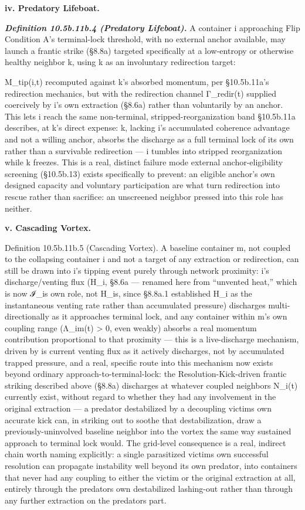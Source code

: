 \documentclass[
]{article}
\begin{document}
\textbf{iv. Predatory Lifeboat.}

\emph{\textbf{Definition 10.5b.11b.4 (Predatory Lifeboat).}} A container
i approaching Flip Condition A's terminal-lock threshold, with no
external anchor available, may launch a frantic strike (§8.8a) targeted
specifically at a low-entropy or otherwise healthy neighbor k, using k
as an involuntary redirection target:

M\_tip(i,t) recomputed against k's absorbed momentum, per §10.5b.11a's
redirection mechanics, but with the redirection channel Γ\_redir(t)
supplied coercively by i's own extraction (§8.6a) rather than
voluntarily by an anchor. This lets i reach the same non-terminal,
stripped-reorganization band §10.5b.11a describes, at k's direct
expense: k, lacking i's accumulated coherence advantage and not a
willing anchor, absorbs the discharge as a full terminal lock of its own
rather than a survivable redirection --- i tumbles into stripped
reorganization while k freezes. This is a real, distinct failure mode
external anchor-eligibility screening (§10.5b.13) exists specifically to
prevent: an eligible anchor's own designed capacity and voluntary
participation are what turn redirection into rescue rather than
sacrifice: an unscreened neighbor pressed into this role has neither.

\textbf{v. Cascading Vortex.}

Definition 10.5b.11b.5 (Cascading Vortex). A baseline container m, not
coupled to the collapsing container i and not a target of any extraction
or redirection, can still be drawn into i's tipping event purely through
network proximity: i's discharge/venting flux (H\_i, §8.6a --- renamed
here from ``unvented heat,'' which is now ℐ\_is own role, not H\_is,
since §8.8a.1 established H\_i as the instantaneous venting rate rather
than accumulated pressure) discharges multi-directionally as it
approaches terminal lock, and any container within m's own coupling
range (Λ\_im(t) \textgreater{} 0, even weakly) absorbs a real momentum
contribution proportional to that proximity --- this is a live-discharge
mechanism, driven by is current venting flux as it actively discharges,
not by accumulated trapped pressure, and a real, specific route into
this mechanism now exists beyond ordinary approach-to-terminal-lock: the
Resolution-Kick-driven frantic striking described above (§8.8a)
discharges at whatever coupled neighbors N\_i(t) currently exist,
without regard to whether they had any involvement in the original
extraction --- a predator destabilized by a decoupling victims own
accurate kick can, in striking out to soothe that destabilization, draw
a previously-uninvolved baseline neighbor into the vortex the same way
sustained approach to terminal lock would. The grid-level consequence is
a real, indirect chain worth naming explicitly: a single parasitized
victims own successful resolution can propagate instability well beyond
its own predator, into containers that never had any coupling to either
the victim or the original extraction at all, entirely through the
predators own destabilized lashing-out rather than through any further
extraction on the predators part.
\end{document}
